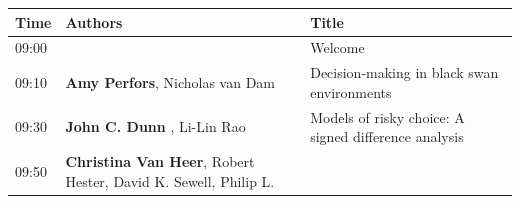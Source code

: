 \documentclass[]{article}
\begin{document}
\begin{longtable}[]{@{}lll@{}}
\toprule
\begin{minipage}[b]{0.03\columnwidth}\raggedright\strut
Time\strut
\end{minipage} & \begin{minipage}[b]{0.38\columnwidth}\raggedright\strut
Authors\strut
\end{minipage} & \begin{minipage}[b]{0.51\columnwidth}\raggedright\strut
Title\strut
\end{minipage}\tabularnewline
\midrule
\endhead
\begin{minipage}[t]{0.03\columnwidth}\raggedright\strut
09:00\strut
\end{minipage} & \begin{minipage}[t]{0.38\columnwidth}\raggedright\strut
\strut
\end{minipage} & \begin{minipage}[t]{0.51\columnwidth}\raggedright\strut
Welcome\strut
\end{minipage}\tabularnewline
\begin{minipage}[t]{0.03\columnwidth}\raggedright\strut
09:10\strut
\end{minipage} & \begin{minipage}[t]{0.38\columnwidth}\raggedright\strut
\textbf{Amy Perfors}, Nicholas van Dam\strut
\end{minipage} & \begin{minipage}[t]{0.51\columnwidth}\raggedright\strut
Decision-making in black swan environments\strut
\end{minipage}\tabularnewline
\begin{minipage}[t]{0.03\columnwidth}\raggedright\strut
09:30\strut
\end{minipage} & \begin{minipage}[t]{0.38\columnwidth}\raggedright\strut
\textbf{John C. Dunn} , Li-Lin Rao\strut
\end{minipage} & \begin{minipage}[t]{0.51\columnwidth}\raggedright\strut
Models of risky choice: A signed difference analysis\strut
\end{minipage}\tabularnewline
\begin{minipage}[t]{0.03\columnwidth}\raggedright\strut
09:50\strut
\end{minipage} & \begin{minipage}[t]{0.38\columnwidth}\raggedright\strut
\textbf{Christina Van Heer}, Robert Hester, David K. Sewell, Philip L.

\end{minipage}
\end{longtable}
\end{document}
